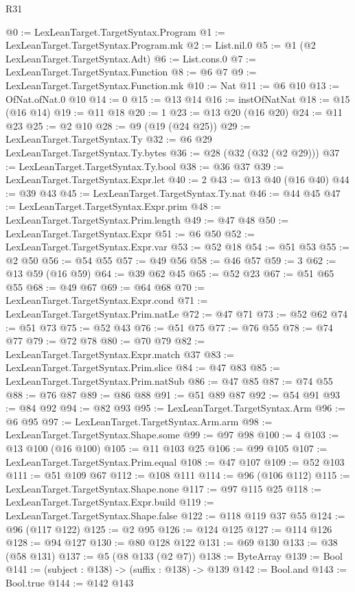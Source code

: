 \begin{lexlean}{R31}
\begin{coremodule}
{{{{{@0 := LexLeanTarget.TargetSyntax.Program
@1 := LexLeanTarget.TargetSyntax.Program.mk
@2 := List.nil.{0}
@5 := @1 (@2 LexLeanTarget.TargetSyntax.Adt)
@6 := List.cons.{0}
@7 := LexLeanTarget.TargetSyntax.Function
@8 := @6 @7
@9 := LexLeanTarget.TargetSyntax.Function.mk
@10 := Nat
@11 := @6 @10
@13 := OfNat.ofNat.{0} @10
@14 := 0
@15 := @13 @14
@16 := instOfNatNat
@18 := @15 (@16 @14)
@19 := @11 @18
@20 := 1
@23 := @13 @20 (@16 @20)
@24 := @11 @23
@25 := @2 @10
@28 := @9 (@19 (@24 @25))
@29 := LexLeanTarget.TargetSyntax.Ty
@32 := @6 @29 LexLeanTarget.TargetSyntax.Ty.bytes
@36 := @28 (@32 (@32 (@2 @29)))
@37 := LexLeanTarget.TargetSyntax.Ty.bool
@38 := @36 @37
@39 := LexLeanTarget.TargetSyntax.Expr.let
@40 := 2
@43 := @13 @40 (@16 @40)
@44 := @39 @43
@45 := LexLeanTarget.TargetSyntax.Ty.nat
@46 := @44 @45
@47 := LexLeanTarget.TargetSyntax.Expr.prim
@48 := LexLeanTarget.TargetSyntax.Prim.length
@49 := @47 @48
@50 := LexLeanTarget.TargetSyntax.Expr
@51 := @6 @50
@52 := LexLeanTarget.TargetSyntax.Expr.var
@53 := @52 @18
@54 := @51 @53
@55 := @2 @50
@56 := @54 @55
@57 := @49 @56
@58 := @46 @57
@59 := 3
@62 := @13 @59 (@16 @59)
@64 := @39 @62 @45
@65 := @52 @23
@67 := @51 @65 @55
@68 := @49 @67
@69 := @64 @68
@70 := LexLeanTarget.TargetSyntax.Expr.cond
@71 := LexLeanTarget.TargetSyntax.Prim.natLe
@72 := @47 @71
@73 := @52 @62
@74 := @51 @73
@75 := @52 @43
@76 := @51 @75
@77 := @76 @55
@78 := @74 @77
@79 := @72 @78
@80 := @70 @79
@82 := LexLeanTarget.TargetSyntax.Expr.match @37
@83 := LexLeanTarget.TargetSyntax.Prim.slice
@84 := @47 @83
@85 := LexLeanTarget.TargetSyntax.Prim.natSub
@86 := @47 @85
@87 := @74 @55
@88 := @76 @87
@89 := @86 @88
@91 := @51 @89 @87
@92 := @54 @91
@93 := @84 @92
@94 := @82 @93
@95 := LexLeanTarget.TargetSyntax.Arm
@96 := @6 @95
@97 := LexLeanTarget.TargetSyntax.Arm.arm
@98 := LexLeanTarget.TargetSyntax.Shape.some
@99 := @97 @98
@100 := 4
@103 := @13 @100 (@16 @100)
@105 := @11 @103 @25
@106 := @99 @105
@107 := LexLeanTarget.TargetSyntax.Prim.equal
@108 := @47 @107
@109 := @52 @103
@111 := @51 @109 @67
@112 := @108 @111
@114 := @96 (@106 @112)
@115 := LexLeanTarget.TargetSyntax.Shape.none
@117 := @97 @115 @25
@118 := LexLeanTarget.TargetSyntax.Expr.build
@119 := LexLeanTarget.TargetSyntax.Shape.false
@122 := @118 @119 @37 @55
@124 := @96 (@117 @122)
@125 := @2 @95
@126 := @124 @125
@127 := @114 @126
@128 := @94 @127
@130 := @80 @128 @122
@131 := @69 @130
@133 := @38 (@58 @131)
@137 := @5 (@8 @133 (@2 @7))
@138 := ByteArray
@139 := Bool
@141 := (subject : @138) -> (suffix : @138) -> @139
@142 := Bool.and
@143 := Bool.true
@144 := @142 @143
}}}}}
\end{coremodule}
\end{lexlean}
